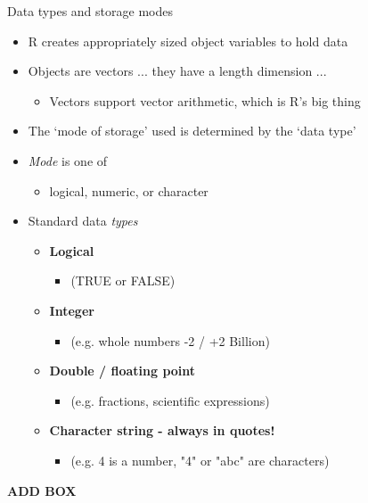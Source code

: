 \documentclass{beamer}
\begin{document}
\begin{frame}{Data types and storage modes}
    \begin{itemize}
        \item R creates appropriately sized object variables to hold data
        \item Objects are vectors ... they have a length dimension ...
        \begin{itemize}
            \item Vectors support vector arithmetic, which is R's big thing
        \end{itemize}
        \item The `mode of storage' used is determined by the `data type'
        \item \emph{Mode} is one of
        \begin{itemize}
            \item logical, numeric, or character
        \end{itemize}
        \item Standard data \emph{types}
        \begin{itemize}
            \item \textbf{Logical}
            \begin{itemize}
                \item (TRUE or FALSE)
            \end{itemize}
            \item \textbf{Integer}
            \begin{itemize}
                \item (e.g. whole numbers -2 / +2 Billion)
            \end{itemize}
            \item \textbf{Double / floating point}
            \begin{itemize}
                \item (e.g. fractions, scientific expressions)
            \end{itemize}
            \item \textbf{Character string - always in quotes!}
            \begin{itemize}
                \item (e.g. 4 is a number, "4" or "abc" are characters)
            \end{itemize}
        \end{itemize}
    \end{itemize}
    
    \textbf{ADD BOX}
\end{frame}
\end{document}
